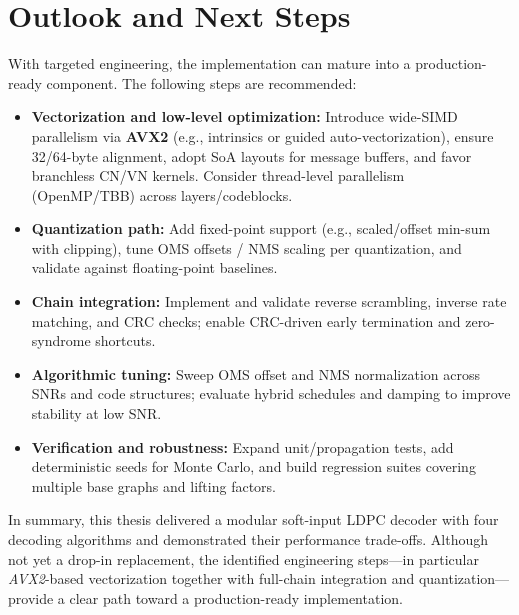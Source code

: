 \documentclass[../main.tex]{subfiles}
\begin{document}
\section*{Outlook and Next Steps}
With targeted engineering, the implementation can mature into a production-ready component. The following steps are recommended:
\begin{itemize}
  \item \textbf{Vectorization and low-level optimization:} Introduce wide-SIMD parallelism via \textbf{AVX2} (e.g., intrinsics or guided auto-vectorization), ensure 32/64-byte alignment, adopt SoA layouts for message buffers, and favor branchless CN/VN kernels. Consider thread-level parallelism (OpenMP/TBB) across layers/codeblocks.
  \item \textbf{Quantization path:} Add fixed-point support (e.g., scaled/offset min-sum with clipping), tune OMS offsets / NMS scaling per quantization, and validate against floating-point baselines.
  \item \textbf{Chain integration:} Implement and validate reverse scrambling, inverse rate matching, and CRC checks; enable CRC-driven early termination and zero-syndrome shortcuts.
  \item \textbf{Algorithmic tuning:} Sweep OMS offset and NMS normalization across SNRs and code structures; evaluate hybrid schedules and damping to improve stability at low SNR.
  \item \textbf{Verification and robustness:} Expand unit/propagation tests, add deterministic seeds for Monte Carlo, and build regression suites covering multiple base graphs and lifting factors.
\end{itemize}

\noindent In summary, this thesis delivered a modular soft-input LDPC decoder with four decoding algorithms and demonstrated their performance trade-offs. Although not yet a drop-in replacement, the identified engineering steps---in particular \emph{AVX2}-based vectorization together with full-chain integration and quantization---provide a clear path toward a production-ready implementation.
\end{document}
